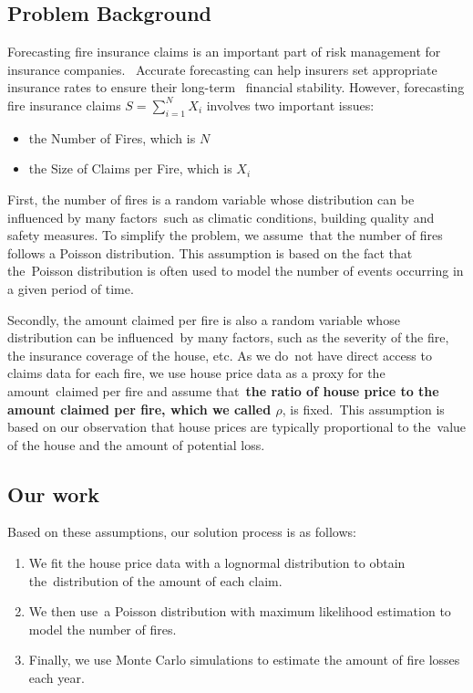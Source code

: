 \documentclass[12pt]{article}  %
\begin{document}
\subsection{Problem Background}
Forecasting fire insurance claims is an important part of risk management for insurance companies. \
Accurate forecasting can help insurers set appropriate insurance rates to ensure their long-term \ 
financial stability. However, forecasting fire insurance claims $S=\sum^{N}_{i=1}X_i$ involves two important issues: \ 

\begin{itemize}
    \item the Number of Fires, which is $N$
    \item the Size of Claims per Fire, which is $X_i$
\end{itemize}

First, the number of fires is a random variable whose distribution can be influenced by many factors\ 
such as climatic conditions, building quality and safety measures. To simplify the problem, we assume\ 
that the number of fires follows a Poisson distribution. This assumption is based on the fact that the\ 
Poisson distribution is often used to model the number of events occurring in a given period of time. \textsuperscript{\cite{poisson}}

Secondly, the amount claimed per fire is also a random variable whose distribution can be influenced\ 
by many factors, such as the severity of the fire, the insurance coverage of the house, etc. As we do\
not have direct access to claims data for each fire, we use house price data as a proxy for the amount\
claimed per fire and assume that\
\textbf{the ratio of house price to the amount claimed per fire, which we called  $ \rho $}, is fixed.\
This assumption is based on our observation that house prices are typically proportional to the\
value of the house and the amount of potential loss.

\subsection{Our work}

Based on these assumptions, our solution process is as follows:    

\begin{enumerate}[\bfseries 1.]
    \item We fit the house price data with a lognormal distribution to obtain the\ 
    distribution of the amount of each claim.\textsuperscript{\cite{house1, house2}}
    \item We then use\ 
    a Poisson distribution with maximum likelihood estimation to model the number of fires.
    \item Finally, we use Monte Carlo simulations to estimate the amount of fire losses each year.
\end{enumerate}
\end{document}
